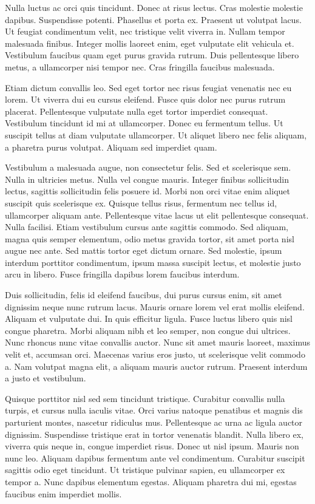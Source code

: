 \documentclass[a4paper,12pt]{article}
\begin{document}
	Nulla luctus ac orci quis tincidunt. Donec at risus lectus. Cras molestie molestie dapibus. Suspendisse potenti. Phasellus et porta ex. Praesent ut volutpat lacus. Ut feugiat condimentum velit, nec tristique velit viverra in. Nullam tempor malesuada finibus. Integer mollis laoreet enim, eget vulputate elit vehicula et. Vestibulum faucibus quam eget purus gravida rutrum. Duis pellentesque libero metus, a ullamcorper nisi tempor nec. Cras fringilla faucibus malesuada.

	Etiam dictum convallis leo. Sed eget tortor nec risus feugiat venenatis nec eu lorem. Ut viverra dui eu cursus eleifend. Fusce quis dolor nec purus rutrum placerat. Pellentesque vulputate nulla eget tortor imperdiet consequat. Vestibulum tincidunt id mi at ullamcorper. Donec eu fermentum tellus. Ut suscipit tellus at diam vulputate ullamcorper. Ut aliquet libero nec felis aliquam, a pharetra purus volutpat. Aliquam sed imperdiet quam.

	Vestibulum a malesuada augue, non consectetur felis. Sed et scelerisque sem. Nulla in ultricies metus. Nulla vel congue mauris. Integer finibus sollicitudin lectus, sagittis sollicitudin felis posuere id. Morbi non orci vitae enim aliquet suscipit quis scelerisque ex. Quisque tellus risus, fermentum nec tellus id, ullamcorper aliquam ante. Pellentesque vitae lacus ut elit pellentesque consequat. Nulla facilisi. Etiam vestibulum cursus ante sagittis commodo. Sed aliquam, magna quis semper elementum, odio metus gravida tortor, sit amet porta nisl augue nec ante. Sed mattis tortor eget dictum ornare. Sed molestie, ipsum interdum porttitor condimentum, ipsum massa suscipit lectus, et molestie justo arcu in libero. Fusce fringilla dapibus lorem faucibus interdum.

	Duis sollicitudin, felis id eleifend faucibus, dui purus cursus enim, sit amet dignissim neque nunc rutrum lacus. Mauris ornare lorem vel erat mollis eleifend. Aliquam et vulputate dui. In quis efficitur ligula. Fusce luctus libero quis nisl congue pharetra. Morbi aliquam nibh et leo semper, non congue dui ultrices. Nunc rhoncus nunc vitae convallis auctor. Nunc sit amet mauris laoreet, maximus velit et, accumsan orci. Maecenas varius eros justo, ut scelerisque velit commodo a. Nam volutpat magna elit, a aliquam mauris auctor rutrum. Praesent interdum a justo et vestibulum.

	Quisque porttitor nisl sed sem tincidunt tristique. Curabitur convallis nulla turpis, et cursus nulla iaculis vitae. Orci varius natoque penatibus et magnis dis parturient montes, nascetur ridiculus mus. Pellentesque ac urna ac ligula auctor dignissim. Suspendisse tristique erat in tortor venenatis blandit. Nulla libero ex, viverra quis neque in, congue imperdiet risus. Donec ut nisl ipsum. Mauris non nunc leo. Aliquam dapibus fermentum ante vel condimentum. Curabitur suscipit sagittis odio eget tincidunt. Ut tristique pulvinar sapien, eu ullamcorper ex tempor a. Nunc dapibus elementum egestas. Aliquam pharetra dui mi, egestas faucibus enim imperdiet mollis.
\end{document}
